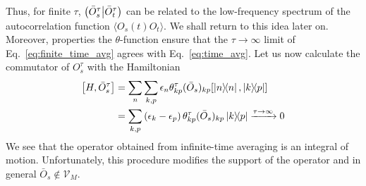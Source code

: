 Thus, for finite \(\tau\), \(\left(\bar{O}_s^{\tau} \middle| \bar{O}_t^{\tau}\right)\) can be related to the low-frequency spectrum of 
the autocorrelation function \(\langle O_s(t) O_t \rangle\). We shall return to this idea later on.
Moreover, properties the \(\theta\)-function ensure that the \(\tau\to\infty\) limit of Eq.~\eqref{eq:finite_time_avg}
agrees with Eq.~\eqref{eq:time_avg}. Let us now calculate the commutator of \(O_s^{\tau}\) with the Hamiltonian
\begin{align}
    \comm{H}{\bar{O}_s^{\tau}} & = \sum_n \sum_{k,p} \epsilon_n \theta_{kp}^{\tau} (\bar{O}_s)_{kp} \comm{ \ketbra{n}{n}}{ \ketbra{k}{p}} \nonumber         \\
                             & = \sum_{k,p} \left(\epsilon_k-\epsilon_p\right) \theta_{kp}^{\tau} (\bar{O}_s)_{kp} \ketbra{k}{p} \xrightarrow{\tau \to \infty} 0 
        \label{eq:time_averaged_commutator}
\end{align}
We see that the operator obtained from infinite-time averaging is an integral of motion. Unfortunately,
this procedure modifies the support of the operator and in general \(\bar{O}_s \not\in \mathcal{V}_M\).

